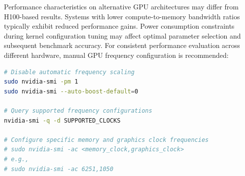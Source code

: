 Performance characteristics on alternative GPU architectures may differ from H100-based results. Systems with lower compute-to-memory bandwidth ratios typically exhibit reduced performance gains. Power consumption constraints during kernel configuration tuning may affect optimal parameter selection and subsequent benchmark accuracy. For consistent performance evaluation across different hardware, manual GPU frequency configuration is recommended:
\vspace{3pt}
\begin{lstlisting}[language=bash]
# Disable automatic frequency scaling
sudo nvidia-smi -pm 1
sudo nvidia-smi --auto-boost-default=0

# Query supported frequency configurations
nvidia-smi -q -d SUPPORTED_CLOCKS

# Configure specific memory and graphics clock frequencies
# sudo nvidia-smi -ac <memory_clock,graphics_clock>
# e.g.,
# sudo nvidia-smi -ac 6251,1050
\end{lstlisting}



